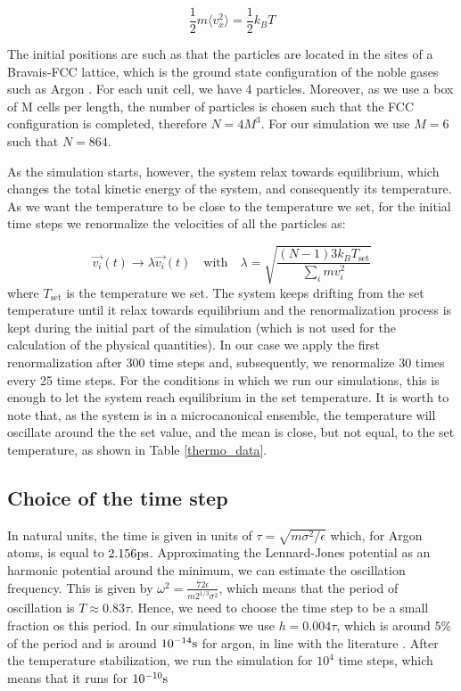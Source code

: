 \documentclass[aps,prl,reprint,groupedaddress]{revtex4-1}
\begin{document}
\begin{equation}
	\frac{1}{2}m \langle v_x^2 \rangle = \frac{1}{2}  k_B T 
\end{equation}

The initial positions are such as that the particles are located in the sites of a Bravais-FCC lattice, which is the ground state configuration of the noble gases such as Argon \cite{ICCPBook}. For each unit cell, we have 4 particles. Moreover, as we use a box of M cells per length, the number of particles is chosen such that the FCC configuration is completed, therefore $N = 4M^3$. For our simulation we use $M=6$ such that $N=864$.

As the simulation starts, however, the system relax towards equilibrium, which changes the total kinetic energy of the system, and consequently its temperature. As we want the temperature to be close to the temperature we set, for the initial time steps we renormalize the velocities of all the particles as:

\begin{equation}
	\vec{v_i}(t) \to \lambda \vec{v_i}(t) \quad \text{with} \quad \lambda = \sqrt{\frac{(N-1)3k_BT_{\text{set}}}{\sum_i mv_i^2}}
\end{equation}
where $T_{\text{set}}$ is the temperature we set. The system keeps drifting from the set temperature until it relax towards equilibrium and the renormalization process is kept during the initial part of the simulation (which is not used for the calculation of the physical quantities). In our case we apply the first renormalization after 300 time steps and, subsequently, we renormalize 30 times every 25 time steps. For the conditions in which we run our simulations, this is enough to let the system reach equilibrium in the set temperature. It is worth to note that, as the system is in a microcanonical ensemble, the temperature will oscillate around the the set value, and the mean is close, but not equal, to the set temperature, as shown in Table \ref{thermo_data}.

\subsection{Choice of the time step}

In natural units, the time is given in units of $\tau = \sqrt{m \sigma^2/\epsilon}$ which, for Argon atoms, is equal to $2.156 \textup{ps}$. Approximating the Lennard-Jones potential as an harmonic potential around the minimum, we can estimate the oscillation frequency. This is given by $\omega^2 = \frac{72 \epsilon}{m 2^{1/3} \sigma^2}$, which means that the period of oscillation is $T \approx 0.83 \tau$. Hence, we need to choose the time step to be a small fraction os this period. In our simulations we use $h = 0.004 \tau$, which is around $5 \%$ of the period and is around $10^{-14} \textup{s}$ for argon, in line with the literature \cite{Rahman1964}. After the temperature stabilization, we run the simulation for $10^4$ time steps, which means that it runs for $10^{-10} \textup{s}$
\end{document}
